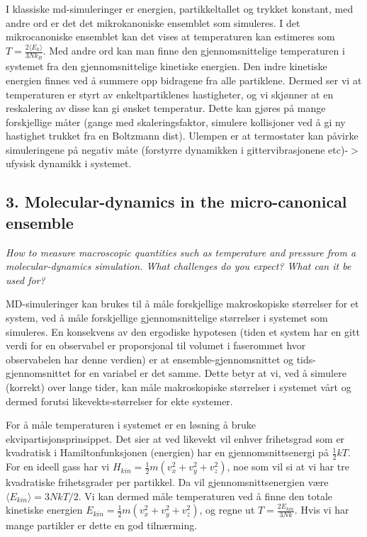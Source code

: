 \documentclass[a4paper,10pt]{article}
\begin{document}
I klassiske md-simuleringer er energien, partikkeltallet og trykket konstant, med andre ord er det det mikrokanoniske ensemblet som simuleres. I det mikrocanoniske ensemblet kan det vises at temperaturen kan estimeres som $T = \frac{2\langle E_k\rangle}{3Nk_B}$. Med andre ord kan man finne den gjennomsnittelige temperaturen i systemet fra den gjennomsnittelige kinetiske energien. Den indre kinetiske energien finnes ved å summere opp bidragene fra alle partiklene. Dermed ser vi at temperaturen er styrt av enkeltpartiklenes hastigheter, og vi skjønner at en reskalering av disse kan gi ønsket temperatur. Dette kan gjøres på mange forskjellige måter (gange med skaleringsfaktor, simulere kollisjoner ved å gi ny hastighet trukket fra en Boltzmann dist). Ulempen er at termostater kan påvirke simuleringene på negativ måte (forstyrre dynamikken i gittervibrasjonene etc)-$>$ ufysisk dynamikk i systemet.



\subsection*{3. Molecular-dynamics in the micro-canonical ensemble}

\textit{How to measure macroscopic quantities such as temperature and pressure from
a molecular-dynamics simulation. What challenges do you expect? What can
it be used for?}


MD-simuleringer kan brukes til å måle forskjellige makroskopiske størrelser for et system, ved å måle forskjellige gjennomsnittelige størrelser i systemet som simuleres. En konsekvens av den ergodiske hypotesen (tiden et system har en gitt verdi for en observabel er proporsjonal til volumet i faserommet hvor observabelen har denne verdien) er at ensemble-gjennomsnittet og tids-gjennomsnittet for en variabel er det samme. Dette betyr at vi, ved å simulere (korrekt) over lange tider, kan måle makroskopiske størrelser i systemet vårt og dermed forutsi likevekts-størrelser for ekte systemer. 

For å måle temperaturen i systemet er en løsning å bruke ekvipartisjonsprinsippet. Det sier at ved likevekt vil enhver frihetsgrad som er kvadratisk i Hamiltonfunksjonen (energien) har en gjennomsnittsenergi på $\frac{1}{2} kT$. For en ideell gass har vi $H_{kin} = \frac{1}{2} m(v_x^2 + v_y^2 + v_z^2)$, noe som vil si at vi har tre kvadratiske frihetsgrader per partikkel. Da vil gjennomsnittsenergien være $\langle E_{kin}\rangle = 3NkT/2$. Vi kan dermed måle temperaturen ved å finne den totale kinetiske energien $E_{kin} = \frac{1}{2} m(v_x^2 + v_y^2 + v_z^2)$, og regne ut $T =\frac{2E_{kin}}{3Nk}$. Hvis vi har mange partikler er dette en god tilnærming.
\end{document}
